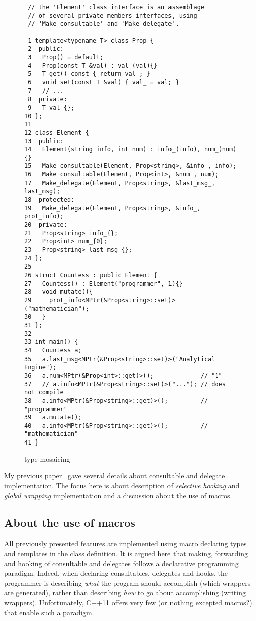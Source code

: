 \documentclass{article}
\begin{document}
\begin{figure}[ht]
{\small
\begin{lstlisting}
 // the 'Element' class interface is an assemblage 
 // of several private members interfaces, using 
 // 'Make_consultable' and 'Make_delegate'.

 1 template<typename T> class Prop {
 2  public:
 3   Prop() = default;
 4   Prop(const T &val) : val_(val){}
 5   T get() const { return val_; }
 6   void set(const T &val) { val_ = val; }
 7   // ...
 8  private:
 9   T val_{};
10 };
11 
12 class Element {
13  public:
14   Element(string info, int num) : info_(info), num_(num){}
15   Make_consultable(Element, Prop<string>, &info_, info);
16   Make_consultable(Element, Prop<int>, &num_, num);
17   Make_delegate(Element, Prop<string>, &last_msg_, last_msg);
18  protected:
19   Make_delegate(Element, Prop<string>, &info_, prot_info);
20  private:
21   Prop<string> info_{};
22   Prop<int> num_{0};
23   Prop<string> last_msg_{};
24 };
25 
26 struct Countess : public Element {
27   Countess() : Element("programmer", 1){}
28   void mutate(){
29     prot_info<MPtr(&Prop<string>::set)>("mathematician");
30   }
31 };
32 
33 int main() {
34   Countess a;
35   a.last_msg<MPtr(&Prop<string>::set)>("Analytical Engine");
36   a.num<MPtr(&Prop<int>::get)>();             // "1"
37   // a.info<MPtr(&Prop<string>::set)>("..."); // does not compile
38   a.info<MPtr(&Prop<string>::get)>();         // "programmer"
39   a.mutate();
40   a.info<MPtr(&Prop<string>::get)>();         // "mathematician"
41 }
\end{lstlisting}}
\cprotect\caption{type mosaicing}
\label{example:type_mosaicing}
\end{figure}

My previous paper~\cite{2015consultable} gave several details about consultable and delegate implementation. The focus here is about description of \textit{selective hooking} and \textit{global wrapping} implementation and a discussion about the use of macros.

\subsection{About the use of macros}
All previously presented features are implemented using macro declaring types and templates in the class definition. It is argued here that making, forwarding and hooking of consultable and delegates follows a declarative programming paradigm. Indeed, when declaring consultables, delegates and hooks, the programmer is describing \textit{what} the program should accomplish (which wrappers are generated), rather than describing \textit{how} to go about accomplishing (writing wrappers). Unfortunately, C++11 offers very few (or nothing excepted macros?) that enable such a paradigm.   
\end{document}
